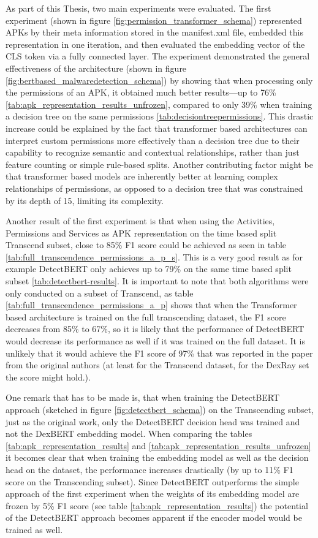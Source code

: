 As part of this Thesis, two main experiments were evaluated.
The first experiment (shown in figure \ref{fig:permission_transformer_schema}) represented
APKs by their meta information stored in the manifest.xml file, embedded this representation
in one iteration, and then evaluated the embedding vector of the CLS token via a fully connected layer.
The experiment demonstrated the general effectiveness of the architecture
(shown in figure \ref{fig:bertbased_malwaredetection_schema}) by showing that when processing only
the permissions of an APK, it obtained much better results—up to 76\%
\ref{tab:apk_representation_results_unfrozen}, compared to only 39\% when training a decision tree
on the same permissions \ref{tab:decisiontreepermissions}. 
This drastic increase could be explained by the fact that transformer 
based architectures can interpret custom permissions more effectively than a decision tree due 
to their capability to recognize semantic and contextual relationships, 
rather than just feature counting or simple rule-based splits. 
Another contributing factor might be that transformer based models are inherently better at 
learning complex relationships of permissions, 
as opposed to a decision tree that was constrained by its depth of 15, limiting its complexity.

Another result of the first experiment is that when using the Activities, Permissions and Services 
as APK representation on the time based split Transcend subset, close to 85\% 
F1 score could be achieved as seen in table \ref{tab:full_transcendence_permissions_a_p_s}.
This is a very good result as for example DetectBERT only achieves up to 79\% on the same time based 
split subset \ref{tab:detectbert-results}.
It is important to note that both algorithms were only conducted on a subset of Transcend,
as table \ref{tab:full_transcendence_permissions_a_p} shows that when the Transformer based
architecture is trained on the full transcending dataset, the F1 score decreases from 85\% 
to 67\%, so it is likely that the performance of DetectBERT would decrease its performance
as well if it was trained on the full dataset. It is unlikely that it would achieve the
F1 score of 97\% that was reported in the paper from the original authors \cite{detectbert}
(at least for the Transcend dataset, for the DexRay set the score might hold.).

One remark that has to be made is, that when training the DetectBERT approach 
(sketched in figure \ref{fig:detectbert_schema}) on the Transcending subset, just as the original work, 
only the DetectBERT decision head was trained and not the DexBERT embedding model.
When comparing the tables \ref{tab:apk_representation_results} and 
\ref{tab:apk_representation_results_unfrozen} it becomes clear that when training the embedding 
model as well as the decision head on the dataset, the performance increases drastically (by
up to 11\% F1 score on the Transcending subset).
Since DetectBERT outperforms the simple approach of the first experiment when the weights 
of its embedding model are frozen by 5\% F1 score (see table \ref{tab:apk_representation_results}) the 
potential of the DetectBERT approach becomes apparent if the encoder model would be trained as well.

